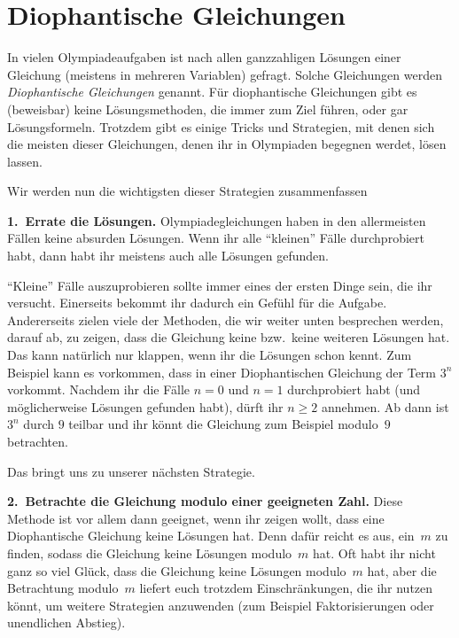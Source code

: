\section{Diophantische Gleichungen}\label{kapitel:Diophantastisch}

In vielen Olympiadeaufgaben ist nach allen ganzzahligen Lösungen einer Gleichung (meistens in mehreren Variablen) gefragt. Solche Gleichungen werden \emph{Diophantische Gleichungen} genannt. Für diophantische Gleichungen gibt es (beweisbar) keine Lösungsmethoden, die immer zum Ziel führen, oder gar Lösungsformeln. Trotzdem gibt es einige Tricks und Strategien, mit denen sich die meisten dieser Gleichungen, denen ihr in Olympiaden begegnen werdet, lösen lassen.

Wir werden nun die wichtigsten dieser Strategien zusammenfassen

\textbf{1.~Errate die Lösungen.} Olympiadegleichungen haben in den allermeisten Fällen keine absurden Lösungen. Wenn ihr alle \enquote{kleinen} Fälle durchprobiert habt, dann habt ihr meistens auch alle Lösungen gefunden.

\enquote{Kleine} Fälle auszuprobieren sollte immer eines der ersten Dinge sein, die ihr versucht. Einerseits bekommt ihr dadurch ein Gefühl für die Aufgabe. Andererseits zielen viele der Methoden, die wir weiter unten besprechen werden, darauf ab, zu zeigen, dass die Gleichung keine bzw.\ keine weiteren Lösungen hat. Das kann natürlich nur klappen, wenn ihr die Lösungen schon kennt. Zum Beispiel kann es vorkommen, dass in einer Diophantischen Gleichung der Term $3^n$ vorkommt. Nachdem ihr die Fälle $n=0$ und $n=1$ durchprobiert habt (und möglicherweise Lösungen gefunden habt), dürft ihr $n\geqslant 2$ annehmen. Ab dann ist $3^n$ durch $9$ teilbar und ihr könnt die Gleichung zum Beispiel modulo~$9$ betrachten.

Das bringt uns zu unserer nächsten Strategie.

\textbf{2.~Betrachte die Gleichung modulo einer geeigneten Zahl.} Diese Methode ist vor allem dann geeignet, wenn ihr zeigen wollt, dass eine Diophantische Gleichung keine Lösungen hat. Denn dafür reicht es aus, ein~$m$ zu finden, sodass die Gleichung keine Lösungen modulo~$m$ hat. Oft habt ihr nicht ganz so viel Glück, dass die Gleichung keine Lösungen modulo~$m$ hat, aber die Betrachtung modulo~$m$ liefert euch trotzdem Einschränkungen, die ihr nutzen könnt, um weitere Strategien anzuwenden (zum Beispiel Faktorisierungen oder unendlichen Abstieg).

